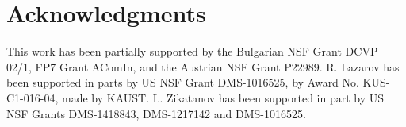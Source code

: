 \documentclass[11pt]{amsart}
\numberwithin{equation}{section}
\theoremstyle{definition}\newtheorem{example}{Example}[section]
\begin{document}
\section*{Acknowledgments}
This work has been partially supported by the Bulgarian NSF Grant DCVP
02/1, FP7 Grant AComIn, and the Austrian NSF Grant P22989. R. Lazarov
has been supported in parts by US NSF Grant DMS-1016525, by Award
No. KUS-C1-016-04, made by KAUST. L. Zikatanov has been supported in
part by US NSF Grants DMS-1418843, DMS-1217142 and DMS-1016525.



\end{document}
